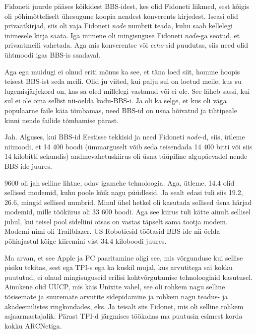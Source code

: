 Fidoneti juurde pääses kõikidest BBS-idest, kes olid Fidoneti liikmed, sest 
kõigis oli põhimõtteliselt ühesugune koopia nendest konverents kirjedest. 
Iseasi olid privaatkirjad, siis oli  vaja Fidoneti \emph{node} numbrit teada, 
kuhu saab kellelegi inimesele kirja saata. Iga inimene oli  mingisuguse 
Fidoneti \emph{node}-ga seotud, et  privaatmeili vahetada. Aga mis konverentse 
või \emph{echo}-sid puudutas,  siis need  olid ühtmoodi igas BBS-is  saadaval.

Aga ega muidugi ei olnud eriti mõnus ka see, et täna loed siit, homme  hoopis 
teisest BBS-ist seda meili. Olid ju viited, kui palju sul on loetud meile, kus 
su lugemisjärjekord on, kas sa oled millelegi vastanud või ei ole. See  läheb 
sassi, kui sul ei ole oma sellist nii-öelda kodu-BBS-i. Ja oli ka selge, et kus 
oli väga populaarne faile käia tõmbamas,  need BBS-id on  üsna hõivatud ja 
tihtipeale kinni nende failide tõmbamise pärast. 


Jah. Alguses, kui BBS-id Eestisse tekkisid ja need Fidoneti \emph{node}-d, 
siis, ütleme niimoodi, et 14 400 boodi (ümmarguselt võib seda teisendada 14 400 
bitti või siis 14 kilobitti sekundis) andmevahetuskiirus oli üsna tüüpiline  
algupäevadel nende BBS-ide juures.


9600 oli jah selline lihtne, odav igamehe tehnoloogia. Aga, ütleme, 14.4 olid 
sellised modemid, kuhu poole kõik nagu püüdlesid. Ja sealt edasi tuli siis 
19.2, 26.6, mingid sellised numbrid. Minul ühel hetkel oli kasutada sellised 
üsna  härjad modemid, mille töökiirus oli 33 600 boodi. Aga see kiirus tuli 
kätte ainult sellisel juhul, kui teisel pool sideliini otsas on vastas täpselt 
sama tootja modem. Modemi  nimi oli Trailblazer. US Roboticsid  töötasid BBS-ide 
nii-öelda  põhiajastul kõige kiiremini vist 34.4 kiloboodi juures.


Ma arvan, et see Apple ja PC paaritamine oligi see, mis  võrgunduse kui sellise 
pisiku tekitas, sest ega TPI-s ega ka kuskil mujal, kus arvutitega sai kokku 
puututud, ei olnud mingisuguseid erilisi kohtvõrgutamise tehnoloogiaid 
kasutusel. Ainukene olid UUCP, mis käis Unixite vahel, see oli rohkem nagu 
selline tõsisemate ja suuremate arvutite sidepidamine  ja rohkem nagu teadus- 
ja akadeemilistes ringkondades, eks. Ja teisalt siis Fidonet, mis oli selline 
rohkem asjaarmastajalik. Pärast TPI-d järgmises töökohas ma  puutusin esimest 
korda kokku ARCNetiga.

